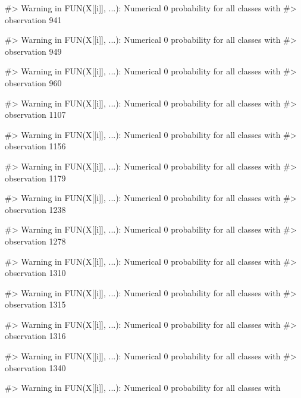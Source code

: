 \begin{Schunk}
\begin{Soutput}
#> Warning in FUN(X[[i]], ...): Numerical 0 probability for all classes with
#> observation 941
\end{Soutput}
\begin{Soutput}
#> Warning in FUN(X[[i]], ...): Numerical 0 probability for all classes with
#> observation 949
\end{Soutput}
\begin{Soutput}
#> Warning in FUN(X[[i]], ...): Numerical 0 probability for all classes with
#> observation 960
\end{Soutput}
\begin{Soutput}
#> Warning in FUN(X[[i]], ...): Numerical 0 probability for all classes with
#> observation 1107
\end{Soutput}
\begin{Soutput}
#> Warning in FUN(X[[i]], ...): Numerical 0 probability for all classes with
#> observation 1156
\end{Soutput}
\begin{Soutput}
#> Warning in FUN(X[[i]], ...): Numerical 0 probability for all classes with
#> observation 1179
\end{Soutput}
\begin{Soutput}
#> Warning in FUN(X[[i]], ...): Numerical 0 probability for all classes with
#> observation 1238
\end{Soutput}
\begin{Soutput}
#> Warning in FUN(X[[i]], ...): Numerical 0 probability for all classes with
#> observation 1278
\end{Soutput}
\begin{Soutput}
#> Warning in FUN(X[[i]], ...): Numerical 0 probability for all classes with
#> observation 1310
\end{Soutput}
\begin{Soutput}
#> Warning in FUN(X[[i]], ...): Numerical 0 probability for all classes with
#> observation 1315
\end{Soutput}
\begin{Soutput}
#> Warning in FUN(X[[i]], ...): Numerical 0 probability for all classes with
#> observation 1316
\end{Soutput}
\begin{Soutput}
#> Warning in FUN(X[[i]], ...): Numerical 0 probability for all classes with
#> observation 1340
\end{Soutput}
\begin{Soutput}
#> Warning in FUN(X[[i]], ...): Numerical 0 probability for all classes with

\end{Soutput}
\end{Schunk}
